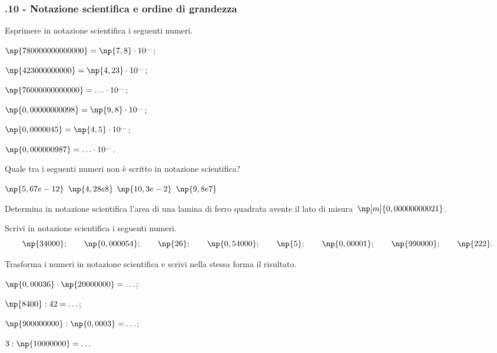 \subsubsection*{\thechapter.10 - Notazione scientifica e ordine di grandezza}

\begin{esercizio}
 \label{ese:3.67}
Esprimere in notazione scientifica i seguenti numeri.
\begin{multicols}{2}
\begin{enumeratea}
\item $\np{780000000000000}=\np{7,8}\cdot10^{\ldots}$;
\item $\np{423000000000}=\np{4,23}\cdot10^{\ldots}$;
\item $\np{76000000000000}= \ldots \cdot 10^{\ldots}$;
\item $\np{0,00000000098}=\np{9,8}\cdot10^{\ldots}$;
\item $\np{0,0000045}=\np{4,5}\cdot10^{\ldots}$;
\item $\np{0,000000987}= \ldots \cdot 10^{\ldots}$.
\end{enumeratea}
\end{multicols}
\end{esercizio}

\begin{esercizio}
 \label{ese:3.68}
Quale tra i seguenti numeri non è scritto in notazione scientifica?

\boxA\quad$\np{5,67e-12}$\qquad
\boxB\quad$\np{4,28e8}$\qquad
\boxC\quad$\np{10,3e-2}$\qquad
\boxD\quad$\np{9,8e7}$\qquad
\end{esercizio}

\begin{esercizio}
 \label{ese:3.69}
Determina in notazione scientifica l'area di una lamina di ferro quadrata
avente il lato di misura~$\np[m]{0,00000000021}$.
\end{esercizio}

\begin{esercizio}
 \label{ese:3.70}
Scrivi in notazione scientifica i seguenti numeri.
\[\np{34000};\qquad\np{0,000054};\qquad\np{26};\qquad\np{0,54000};\qquad\np{5};\qquad\np{0,00001};\qquad\np{990000};\qquad\np{222}.\]
\end{esercizio}
\pagebreak
\begin{esercizio}
 \label{ese:3.71}
Trasforma i numeri in notazione scientifica e scrivi nella stessa forma il risultato.
\begin{multicols}{2}
\begin{enumeratea}
\item $\np{0,00036}\cdot\np{20000000}=\ldots$;
\item $\np{8400}:42=\ldots$;
\item $\np{900000000}:\np{0,0003}=\ldots$;
\item $3:\np{10000000}=\ldots$
\end{enumeratea}
\end{multicols}
\end{esercizio}

